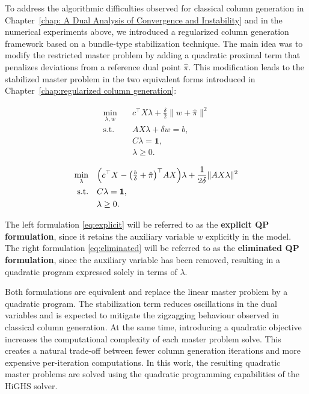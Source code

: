 \documentclass{book}
\theoremstyle{definition}
\newcounter{algorithm_}
\numberwithin{algorithm_}{chapter}
\begin{document}
{To address the algorithmic difficulties observed for classical column generation in Chapter~\ref{chap: A Dual Analysis of Convergence and Instability} and in the numerical experiments above, we introduced a regularized column generation framework based on a bundle-type stabilization technique. The main idea was to modify the restricted master problem by adding a quadratic proximal term that penalizes deviations from a reference dual point $\hat{\pi}$. This modification leads to the stabilized master problem in the two equivalent forms introduced in Chapter~\ref{chap:regularized column generation}:
\begin{center}
\begin{minipage}{0.48\textwidth}
\begin{align*}
\min_{\lambda, w} \quad 
& c^\top X \lambda
+ \frac{\delta}{2} \| w + \hat{\pi} \|^2 \\
\text{s.t.} \quad
& A X \lambda + \delta w = b, \\
& C \lambda = \mathbf{1}, \\
& \lambda \ge 0.
\end{align*}
\end{minipage}
\hfill
\begin{minipage}{0.48\textwidth}
\begin{align*}
\min_{\lambda} \quad
&
\Bigl(
c^\top X
-
\bigl( \tfrac{b}{\delta} + \hat{\pi} \bigr)^\top A X
\Bigr) \lambda
+ \frac{1}{2\delta} \| A X \lambda \|^2 \\
\text{s.t.} \quad
& C \lambda = \mathbf{1}, \\
& \lambda \ge 0.
\end{align*}
\end{minipage}
\end{center}

The left formulation \eqref{eq:explicit} will be referred to as the \textbf{explicit QP formulation}, since it retains the auxiliary variable $w$ explicitly in the model. The right formulation \eqref{eq:eliminated} will be referred to as the \textbf{eliminated QP formulation}, since the auxiliary variable has been removed, resulting in a quadratic program expressed solely in terms of $\lambda$.

Both formulations are equivalent and replace the linear master problem by a quadratic program. The stabilization term reduces oscillations in the dual variables and is expected to mitigate the zigzagging behaviour observed in classical column generation. At the same time, introducing a quadratic objective increases the computational complexity of each master problem solve. This creates a natural trade-off between fewer column generation iterations and more expensive per-iteration computations.
In this work, the resulting quadratic master problems are solved using the quadratic programming capabilities of the HiGHS solver.


}
\end{document}
